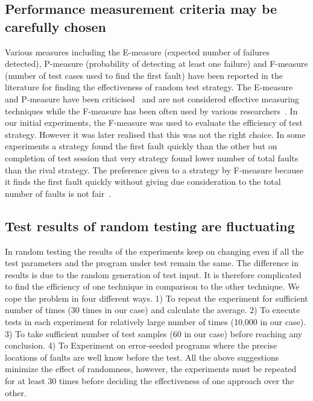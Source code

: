  
\subsection{Performance measurement criteria may be carefully chosen}
Various measures including the E-measure (expected number of failures detected), P-measure (probability of detecting at least one failure) and F-measure (number of test cases used to find the first fault) have been reported in the literature for finding the effectiveness of random test strategy. The E-measure and P-measure have been criticised~\cite{chen2005adaptive} and are not considered effective measuring techniques while the F-measure has been often used by various researchers~\cite{chen2004statistical, chen1996expected}. In our initial experiments, the F-measure was used to evaluate the efficiency of test strategy. However it was later realised that this was not the right choice. In some experiments a strategy found the first fault quickly than the other but on completion of test session that very strategy found lower number of total faults than the rival strategy. The preference given to a strategy by F-measure because it finds the first fault quickly without giving due consideration to the total number of faults is not fair~\cite{liu2012comparison}.

\subsection{Test results of random testing are fluctuating} 
In random testing the results of the experiments keep on changing even if all the test parameters and the program under test remain the same. The difference in results is due to the random generation of test input. It is therefore complicated to find the efficiency of one technique in comparison to the other technique. We cope the problem in four different ways. 1) To repeat the experiment for sufficient number of times (30 times in our case) and calculate the average. 2) To execute tests in each experiment for relatively large number of times (10,000 in our case). 3) To take sufficient number of test samples (60 in our case) before reaching any conclusion. 4) To Experiment on error-seeded programs where the precise locations of faults are well know before the test. All the above suggestions minimize the effect of randomness, however, the experiments must be repeated for at least 30 times before deciding the effectiveness of one approach over the other.

   

